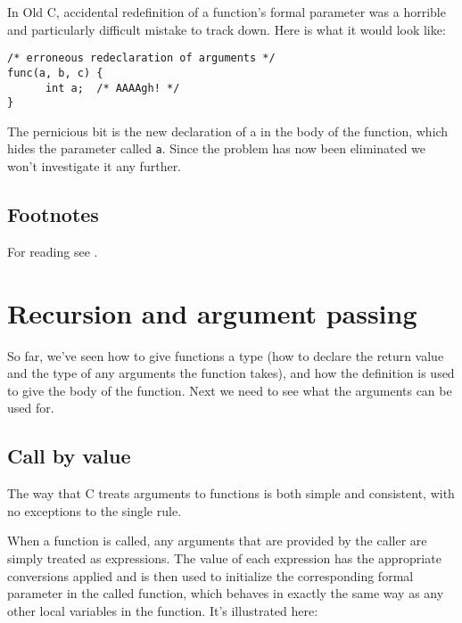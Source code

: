    In Old C, accidental redefinition of a function's formal parameter was
    a horrible and particularly difficult mistake to track down. Here is
    what it would look like:

\begin{Verbatim}
/* erroneous redeclaration of arguments */
func(a, b, c) {
      int a;  /* AAAAgh! */
}
\end{Verbatim}

   The pernicious bit is the new declaration of a in the body of the
    function, which hides the parameter called \texttt{a}. Since the
    problem has now been eliminated we won't investigate it any further.


    \subsection{Footnotes}
    For reading see \cite{Stro}. 



        \section{Recursion and argument passing}
        

  

  So far, we've seen how to give functions a type (how to declare the
   return value and the type of any arguments the function takes), and how
   the definition is used to give the body of the function. Next we need to
   see what the arguments can be used for.


  \subsection{Call by value}
   

   The way that C treats arguments to functions is both simple and
    consistent, with no exceptions to the single rule.


   When a function is called, any arguments that are provided by the
    caller are simply treated as expressions. The value of each expression
    has the appropriate conversions applied and is then used to initialize
    the corresponding formal parameter in the called function, which behaves
    in exactly the same way as any other local variables in the function.
    It's illustrated here:

